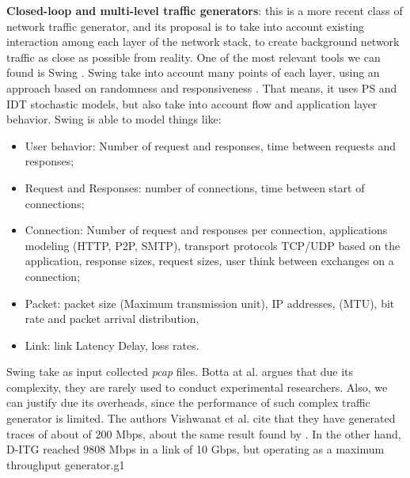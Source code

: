 \textbf{Closed-loop and multi-level traffic generators}: this is a more recent class of network traffic generator, and its proposal is to take into account existing interaction among each layer of the network stack, to create background network traffic as close as possible from reality. One of the most relevant tools we can found is Swing \cite{swing-paper}. Swing take into account many points of each layer, using an approach based on randomness and responsiveness \cite{swing-paper}. That means, it uses PS and IDT stochastic models, but also take into account flow and application layer behavior. Swing is able to model things like\cite{swing-paper}: 
\begin{itemize}

\item User behavior: Number of request and responses, time between requests and responses;

\item Request and Responses: number of connections, time between start of connections;

\item Connection: Number of request and responses per connection, applications modeling (HTTP, P2P, SMTP), transport protocols TCP/UDP based on the application, response sizes, request sizes, user think between exchanges on a connection;

\item Packet: packet size (Maximum transmission unit), IP addresses, (MTU), bit rate and packet arrival distribution, 

\item Link: link Latency Delay, loss rates.


\end{itemize}

Swing take as input collected \textit{pcap} files. Botta at al. \cite{do-you-trust} argues that due its complexity, they are rarely used to conduct experimental researchers. Also, we can  justify due its overheads, since the performance of such complex traffic generator is limited\cite{legotg-paper}. The authors Vishwanat et al. \cite{swing-paper} cite that they have generated traces of about of 200 Mbps, about the same result found by \cite{legotg-paper}. In the other hand, D-ITG reached 9808 Mbps\cite{comparative-trafficgen-tools} in a link of 10 Gbps, but operating as a maximum throughput generator.g1




